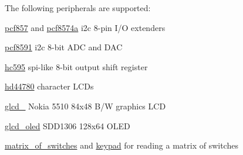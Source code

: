 The following peripherals are supported\+:
\begin{DoxyItemize}
\item \hyperlink{classhwlib_1_1pcf8574}{pcf857} and \hyperlink{namespacehwlib_a1de5a49c6b1b8cd371e5444684018976}{pcf8574a} i2c 8-\/pin I/O extenders
\item \hyperlink{classhwlib_1_1pcf8591}{pcf8591} i2c 8-\/bit A\+DC and D\+AC
\item \hyperlink{classhwlib_1_1hc595}{hc595} spi-\/like 8-\/bit output shift register
\item \hyperlink{classhwlib_1_1hd44780}{hd44780} character L\+C\+Ds
\item \hyperlink{classhwlib_1_1glcd__5510}{glcd\+\_} Nokia \textquotesingle{}5510\textquotesingle{} 84x48 B/W graphics L\+CD
\item \hyperlink{classhwlib_1_1glcd__oled}{glcd\+\_\+oled} S\+D\+D1306 128x64 O\+L\+ED
\item \hyperlink{classhwlib_1_1matrix__of__switches}{matrix\+\_\+of\+\_\+switches} and \hyperlink{classhwlib_1_1keypad}{keypad} for reading a matrix of switches 
\end{DoxyItemize}